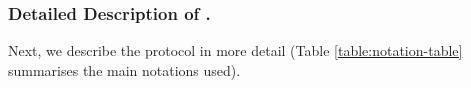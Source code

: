 
\subsubsection{Detailed Description of \epsi.} Next, we describe the protocol in more detail (Table \ref{table:notation-table} summarises the main notations used). 



%





